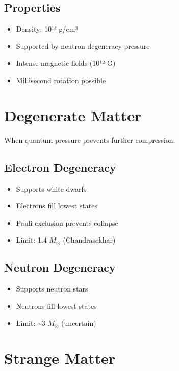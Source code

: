 \documentclass[
  11pt,
  letterpaper,
  twoside,
  openright]{book}
\providecommand{\tightlist}{%
  \setlength{\itemsep}{0pt}\setlength{\parskip}{0pt}}
\begin{document}
\subsection{Properties}\label{properties-9}

\begin{itemize}
\tightlist
\item
  Density: 10¹⁴ g/cm³
\item
  Supported by neutron degeneracy pressure
\item
  Intense magnetic fields (10¹² G)
\item
  Millisecond rotation possible
\end{itemize}

\section{Degenerate Matter}\label{degenerate-matter}

When quantum pressure prevents further compression.

\subsection{Electron Degeneracy}\label{electron-degeneracy}

\begin{itemize}
\tightlist
\item
  Supports white dwarfs
\item
  Electrons fill lowest states
\item
  Pauli exclusion prevents collapse
\item
  Limit: 1.4 \(M_\odot\) (Chandrasekhar)
\end{itemize}

\subsection{Neutron Degeneracy}\label{neutron-degeneracy}

\begin{itemize}
\tightlist
\item
  Supports neutron stars
\item
  Neutrons fill lowest states
\item
  Limit: \textasciitilde3 \(M_\odot\) (uncertain)
\end{itemize}

\section{Strange Matter}\label{strange-matter}
\end{document}
